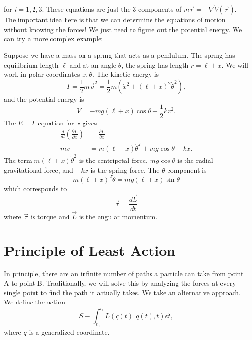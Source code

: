 \documentclass{article}
\numberwithin{equation}{section}
\begin{document}
for $i=1,2,3$. These equations are just the $3$ components of $m\ddot{\vec{r}} = - \vec{\nabla} V(\vec{r})$. The important idea here is that we can determine the equations of motion without knowing the forces! We just need to figure out the potential energy. We can try a more complex example:
\begin{example}
    Suppose we have a mass on a spring that acts as a pendulum. The spring has equilibrium length $\ell$ and at an angle $\theta$, the spring has length $r=\ell + x$. We will work in polar coordinates $x,\theta.$ The kinetic energy is
    \begin{equation}
        T = \frac{1}{2}m\vec{v}^2 = \frac{1}{2}m\left(\dot{x}^2 + (\ell+x)^2\dot{\theta}^2\right),
    \end{equation}
    and the potential energy is
    \begin{equation}
        V = -mg(\ell+x)\cos\theta + \frac{1}{2}kx^2.
    \end{equation}
    The $E-L$ equation for $x$ gives
    \begin{align}
        \frac{d}{dt}\left(\frac{\partial L}{\partial \dot{x}}\right) &= \frac{\partial L}{\partial x} \\
        m\ddot{x} &= m(\ell + x)\dot{\theta}^2 + mg\cos\theta - kx.
    \end{align}
    The term $m(\ell + x)\dot{\theta}^2$ is the centripetal force, $mg\cos\theta$ is the radial gravitational force, and $-kx$ is the spring force. The $\theta$ component is 
    \begin{equation}
        m(\ell + x)^2\dot{\theta} = mg(\ell + x)\sin\theta
    \end{equation}
    which corresponds to 
    \begin{equation}
        \vec{\tau} = \frac{d\vec{L}}{dt}
    \end{equation}
    where $\vec{\tau}$ is torque and $\vec{L}$ is the angular momentum.
\end{example}
\section{Principle of Least Action}
In principle, there are an infinite number of paths a particle can take from point A to point B. Traditionally, we will solve this by analyzing the forces at every single point to find the path it actually takes. We take an alternative approach. We define the action 
\begin{equation}
    S \equiv \int_{t_0}^{t_1} L(q(t),\dot{q}(t),t) \dd{t},
\end{equation}
where $q$ is a generalized coordinate.
\end{document}
